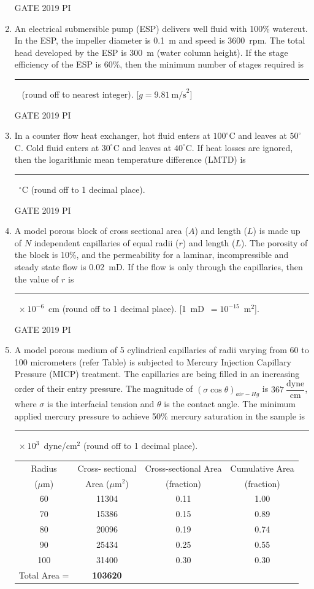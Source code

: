 \documentclass[journal,12pt,onecolumn]{IEEEtran}
\theoremstyle{remark}
\begin{document}
\begin{enumerate}
\hfill{GATE 2019 PI}
\item An electrical submersible pump (ESP) delivers well fluid with 100\% watercut. In the ESP, the impeller diameter is 0.1~m and speed is 3600~rpm. The total head developed by the ESP is 300~m (water column height). If the stage efficiency of the ESP is 60\%, then the minimum number of stages required is \rule{2cm}{0.15mm}~ (round off to nearest integer). [$g = 9.81~\mathrm{m/s}^2$]

\hfill{GATE 2019 PI}

\item In a counter flow heat exchanger, hot fluid enters at $100^\circ$C and leaves at $50^\circ$C. Cold fluid enters at $30^\circ$C and leaves at $40^\circ$C. If heat losses are ignored, then the logarithmic mean temperature difference (LMTD) is \rule{2cm}{0.15mm}~$^\circ$C (round off to 1 decimal place).

\hfill{GATE 2019 PI}

\item A model porous block of cross sectional area ($A$) and length ($L$) is made up of $N$ independent capillaries of equal radii ($r$) and length ($L$). The porosity of the block is 10\%, and the permeability for a laminar, incompressible and steady state flow is 0.02~mD. If the flow is only through the capillaries, then the value of $r$ is \rule{2cm}{0.15mm}~$\times~10^{-6}$~cm (round off to 1 decimal place). [1~mD~$= 10^{-15}$~m$^2$].

\hfill{GATE 2019 PI}

\item A model porous medium of 5 cylindrical capillaries of radii varying from 60 to 100 micrometers (refer Table) is subjected to Mercury Injection Capillary Pressure (MICP) treatment. The capillaries are being filled in an increasing order of their entry pressure. The magnitude of $(\sigma\cos\theta)_{air-Hg}$ is $367~\dfrac{\text{dyne}}{\text{cm}}$, where $\sigma$ is the interfacial tension and $\theta$ is the contact angle. The minimum applied mercury pressure to achieve 50\% mercury saturation in the sample is \rule{2cm}{0.15mm}~$\times~10^3$~dyne/cm$^2$ (round off to 1 decimal place).

\begin{center}
\begin{tabular}{|c|c|c|c|}
\hline
Radius & Cross- sectional & Cross-sectional Area & Cumulative Area \\
($\mu$m) & Area ($\mu$m$^2$) & (fraction) & (fraction) \\
\hline
60 & 11304 & 0.11 & 1.00 \\
70 & 15386 & 0.15 & 0.89 \\
80 & 20096 & 0.19 & 0.74 \\
90 & 25434 & 0.25 & 0.55 \\
100 & 31400 & 0.30 & 0.30 \\
\hline
\multicolumn{1}{c}{Total Area =} & \textbf{103620} & & \\
\end{tabular}
\end{center}


\end{enumerate}
\end{document}
